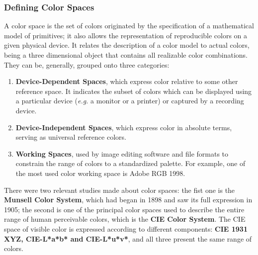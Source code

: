 \subsubsection{Defining Color Spaces}			%
%
A color space is the set of colors originated by the specification of a mathematical model of primitives; it also
allows the representation of reproducible colors on a given physical device. It relates the description
of a color model to actual colors, being a three dimensional object that contains all realizable color
combinations. They can be, generally, grouped onto three categories:
%
\begin{enumerate}
	\setlength\itemsep{0.01em}
	\item \textbf{Device-Dependent Spaces}, which express color relative to some other reference space. It
	  indicates the subset of colors which can be displayed using a particular device (\emph{e.g.} a monitor or a
	  printer) or captured by a recording device.
	\item \textbf{Device-Independent Spaces}, which express color in absolute terms, serving as universal
	  reference colors.
	\item \textbf{Working Spaces}, used by image editing software and file formats to constrain the range of
  	colors to a standardized palette. For example, one of the most used color working space is Adobe RGB 1998.
\end{enumerate} \par
%
There were two relevant studies made about color spaces: the fist one is the \textbf{Munsell Color System},
which had began in 1898 and saw its full expression in 1905; the second is one of the principal color spaces used to describe the
entire range of human perceivable colors, which is the \textbf{CIE Color System}. The CIE space of visible color is expressed
according to different components: \textbf{CIE 1931 XYZ, CIE-L*a*b* and CIE-L*u*v*}, and all three present the same range of colors.
%
